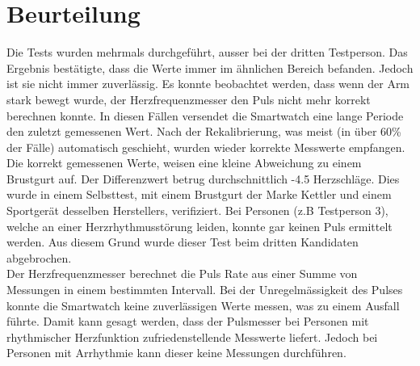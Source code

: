 \section{Beurteilung}
Die Tests wurden mehrmals durchgeführt, ausser bei der dritten Testperson. Das Ergebnis bestätigte, dass die Werte immer im ähnlichen Bereich befanden. Jedoch ist sie nicht immer zuverlässig. Es konnte beobachtet werden, dass wenn der Arm stark bewegt wurde, der Herzfrequenzmesser den Puls nicht mehr korrekt berechnen konnte. In diesen Fällen versendet die Smartwatch eine lange Periode den zuletzt gemessenen Wert. Nach der Rekalibrierung, was meist (in über 60\% der Fälle) automatisch geschieht, wurden wieder korrekte Messwerte empfangen.\\
Die korrekt gemessenen Werte, weisen eine kleine Abweichung zu einem Brustgurt auf. Der Differenzwert betrug durchschnittlich -4.5 Herzschläge. Dies wurde in einem Selbsttest, mit einem Brustgurt der Marke Kettler und einem Sportgerät desselben Herstellers, verifiziert. Bei Personen (z.B Testperson 3), welche an einer Herzrhythmusstörung leiden, konnte gar keinen Puls ermittelt werden. Aus diesem Grund wurde dieser Test beim dritten Kandidaten abgebrochen.\\
Der Herzfrequenzmesser berechnet die Puls Rate aus einer Summe von Messungen in einem bestimmten Intervall. Bei der Unregelmässigkeit des Pulses konnte die Smartwatch keine zuverlässigen Werte messen, was zu einem Ausfall führte. Damit kann gesagt werden, dass der Pulsmesser bei Personen mit rhythmischer Herzfunktion zufriedenstellende Messwerte liefert. Jedoch bei Personen mit Arrhythmie kann dieser keine Messungen durchführen.
